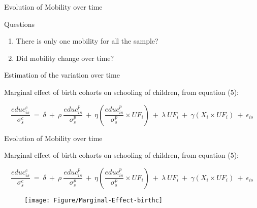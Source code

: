 \documentclass{beamer}
\begin{document}
\setcounter{page}{1}
\setcounter{equation}{0}
\begin{frame} [label=Evolution]{Evolution of Mobility over time}
\begin{block}{Questions}
\begin{enumerate}
\item \footnotesize There is only one mobility for all the sample?
\item \footnotesize Did mobility change over time?
\end{enumerate}
\end{block}


\vspace{1.5cm}
\begin{block}{Estimation of the variation over time}
\begin{itemize}
{\footnotesize\item Marginal effect of birth cohorts on schooling of children, from equation (5):}
\end{itemize}

\begin{scriptsize}
\begin{equation} \label{eq:OLSFixed}
\frac{educ^c_{is}}{\sigma^c_s} \:=\: \delta \:+\: \rho \: \frac{educ^p_{is}}{\sigma^p_s} \:+\: \eta \left(\frac{educ^p_{is}}{\sigma^p_s} \times UF_i \right) \:+\: \lambda \: UF_i \:+\: \gamma \left(X_i \times UF_i \right) \:+\: \epsilon_{is} \nonumber
\end{equation}
\end{scriptsize}
\end{block}
\end{frame}



\begin{frame} {Evolution of Mobility over time}
\begin{itemize}
{\footnotesize\item Marginal effect of birth cohorts on schooling of children, from equation (5):}
\end{itemize}

\begin{scriptsize}
\begin{equation} \label{eq:OLSFixed}
\frac{educ^c_{is}}{\sigma^c_s} \:=\: \delta \:+\: \rho \: \frac{educ^p_{is}}{\sigma^p_s} \:+\: \eta \left(\frac{educ^p_{is}}{\sigma^p_s} \times UF_i \right) \:+\: \lambda \: UF_i \:+\: \gamma \left(X_i \times UF_i \right) \:+\: \epsilon_{is} \nonumber
\end{equation}
\end{scriptsize}

\begin{figure}[htb]
\centering
\texttt{[image: Figure/Marginal-Effect-birthc]}
\flushright \hyperlink{main2}{\beamerbutton{\textcolor{red}{Back to Presentation}}}
\end{figure}
\end{frame}
\end{document}
